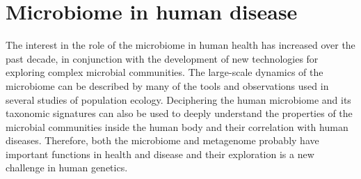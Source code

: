 \logvartrue
\chapter{Microbiome in human disease}
The interest in the role of the microbiome in human health has increased over the past decade, in conjunction with the development of new technologies for exploring complex microbial communities. The large-scale dynamics of the microbiome can be described by many of the tools and observations used in several studies of population ecology. Deciphering the human microbiome and its taxonomic signatures can also be used to deeply understand the properties of the microbial communities inside the human body and their correlation with human diseases. Therefore, both the microbiome and metagenome probably have important functions in health and disease and their exploration is a new challenge in human genetics.\\

